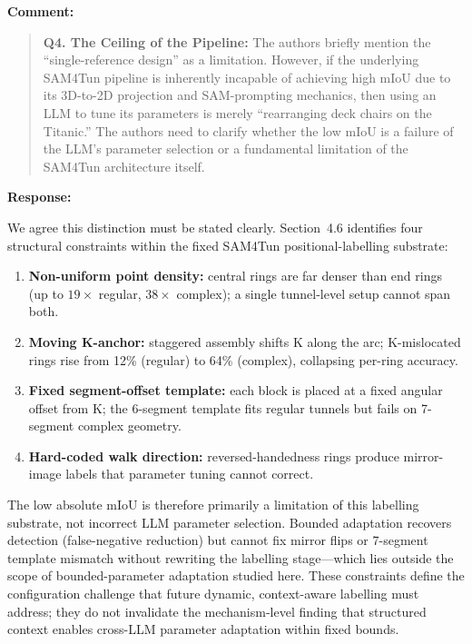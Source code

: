 \documentclass[11pt,a4paper]{article}
\newenvironment{commentblock}{%
  \par\smallskip\noindent\textbf{Comment:}\par
  \begin{quote}\itshape\color{black}
}{%
  \end{quote}\smallskip
}
\newenvironment{responseblock}{%
  \par\smallskip\noindent\textbf{Response:}\par
  \begingroup\color{responsegreen}
}{%
  \endgroup\smallskip
}
\begin{document}
\begin{commentblock}
\textbf{Q4. The Ceiling of the Pipeline:} The authors briefly mention the ``single-reference design'' as a limitation. However, if the underlying SAM4Tun pipeline is inherently incapable of achieving high mIoU due to its 3D-to-2D projection and SAM-prompting mechanics, then using an LLM to tune its parameters is merely ``rearranging deck chairs on the Titanic.'' The authors need to clarify whether the low mIoU is a failure of the LLM's parameter selection or a fundamental limitation of the SAM4Tun architecture itself.
\end{commentblock}
\begin{responseblock}
We agree this distinction must be stated clearly. Section~4.6 identifies four structural constraints within the fixed SAM4Tun positional-labelling substrate:
\begin{enumerate}[nosep]
  \item \textbf{Non-uniform point density:} central rings are far denser than end rings (up to $19\times$ regular, $38\times$ complex); a single tunnel-level setup cannot span both.
  \item \textbf{Moving K-anchor:} staggered assembly shifts K along the arc; K-mislocated rings rise from 12\% (regular) to 64\% (complex), collapsing per-ring accuracy.
  \item \textbf{Fixed segment-offset template:} each block is placed at a fixed angular offset from K; the 6-segment template fits regular tunnels but fails on 7-segment complex geometry.
  \item \textbf{Hard-coded walk direction:} reversed-handedness rings produce mirror-image labels that parameter tuning cannot correct.
\end{enumerate}
The low absolute mIoU is therefore primarily a limitation of this labelling substrate, not incorrect LLM parameter selection. Bounded adaptation recovers detection (false-negative reduction) but cannot fix mirror flips or 7-segment template mismatch without rewriting the labelling stage---which lies outside the scope of bounded-parameter adaptation studied here. These constraints define the configuration challenge that future dynamic, context-aware labelling must address; they do not invalidate the mechanism-level finding that structured context enables cross-LLM parameter adaptation within fixed bounds.
\end{responseblock}
\end{document}
